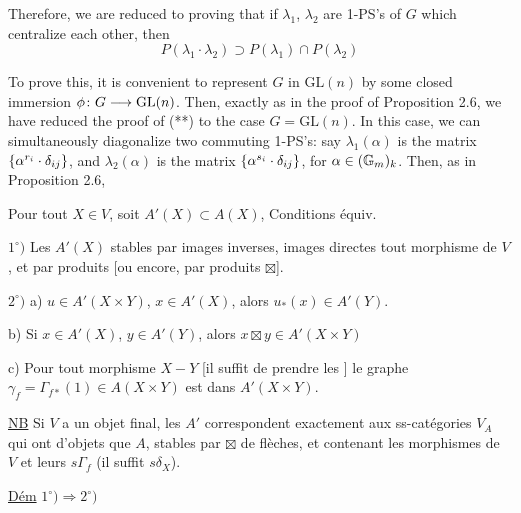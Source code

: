 Therefore, we are reduced to proving that if $\lambda_1$, $\lambda_2$ are 1-PS's of $G$ which centralize each other, then
\begingroup\makeatletter\tagsleft@true\makeatother
\[
 P(\lambda_1\cdot\lambda_2)\supset P(\lambda_1)\cap P(\lambda_2) \tag*{(**)}
\]
\endgroup

To prove this, it is convenient to represent $G$ in $\mathrm{GL}(n)$ by some closed immersion $\phi\colon G\longrightarrow\mathrm{GL}(n)$. Then, exactly as in the proof of Proposition 2.6, we have reduced the proof of (**) to the case $G=\mathrm{GL}(n)$. In this case, we can simultaneously diagonalize two commuting 1-PS's: say $\lambda_1(\alpha)$ is the matrix $\{\alpha^{r_i}\cdot\delta_{ij}\}$, and $\lambda_2(\alpha)$ is the matrix $\{\alpha^{s_i}\cdot\delta_{ij}\}$, for $\alpha\in(\mathbb{G}_m)_k$. Then, as in Proposition 2.6,

Pour tout $X\in V$, soit $A'(X)\subset A(X)$,  Conditions équiv.

$1^\circ)$ Les $A'(X)$ stables par images inverses, images directes  tout morphisme de $V$, et par produits [ou encore, par produits $\boxtimes$].

$2^\circ)$  a) $u\in A'(X\times Y)$, $x\in A'(X)$, alors $u_*(x)\in A'(Y)$.

b) Si $x\in A'(X)$, $y\in A'(Y)$, alors $x\boxtimes y\in A'(X\times Y)$

c) Pour tout morphisme $X\mathbin{-}Y$ [il suffit de prendre les ] le graphe $\gamma_f=\Gamma_{f*}(1)\in A(X\times Y)$ est dans $A'(X\times Y)$.


\uline{NB} Si $V$ a un objet final, les $A'$ correspondent exactement aux ss-catégories  $V_{A}$ qui ont  d'objets que $A$, stables par $\boxtimes$ de flèches, et contenant les   morphismes de $V$ et leurs $s\Gamma_f$ (il suffit $s\delta_X$).

\uline{Dém} \quad $1^\circ)\Longrightarrow 2^\circ)$

